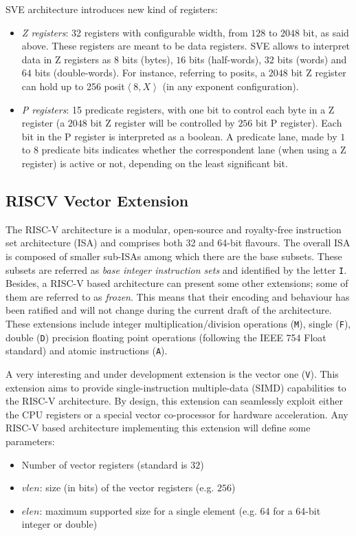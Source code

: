 SVE architecture introduces new kind of registers:
\begin{itemize}
    \item \textit{Z registers}: 32 registers with configurable width, from $128$ to $2048$ bit, as said above. These registers are meant to be data registers. SVE allows to interpret data in Z registers as $8$ bits (bytes), $16$ bits (half-words), $32$ bits (words) and $64$ bits (double-words). For instance, referring to posits, a $2048$ bit Z register can hold up to 256 posit$\left <8,X\right>$ (in any exponent configuration).
    \item \textit{P registers}: 15 predicate registers, with one bit to control each byte in a Z register (a $2048$ bit Z register will be controlled by $256$ bit P register). Each bit in the P register is interpreted as a boolean. A predicate lane, made by $1$ to $8$ predicate bits indicates whether the correspondent lane (when using a Z register) is active or not, depending on the least significant bit.
\end{itemize}


\subsection{RISCV Vector Extension}

The RISC-V \cite{riscvisa} architecture is a modular, open-source and royalty-free instruction set architecture (ISA) and comprises both 32 and 64-bit flavours. The overall ISA is composed of smaller sub-ISAs among which there are the base subsets. These subsets are referred as \textit{base integer instruction sets} and identified by the letter \texttt{I}. Besides, a RISC-V based architecture can present some other extensions; some of them are referred to as \textit{frozen}. This means that their encoding and behaviour has been ratified and will not change during the current draft of the architecture. These extensions include integer multiplication/division operations (\texttt{M}), single (\texttt{F}), double (\texttt{D}) precision floating point operations (following the IEEE 754 Float standard) and atomic instructions (\texttt{A}).

A very interesting and under development extension is the vector one (\texttt{V}). This extension aims to provide single-instruction multiple-data (SIMD) capabilities to the RISC-V architecture. By design, this extension can seamlessly exploit either the CPU registers or a special vector co-processor for hardware acceleration. Any RISC-V based architecture implementing this extension will define some parameters:
\begin{itemize}
    \item Number of vector registers (standard is $32$)
    \item $vlen$: size (in bits) of the vector registers (e.g. $256$)
    \item $elen$: maximum supported size for a single element (e.g. $64$ for a 64-bit integer or double)
\end{itemize}

